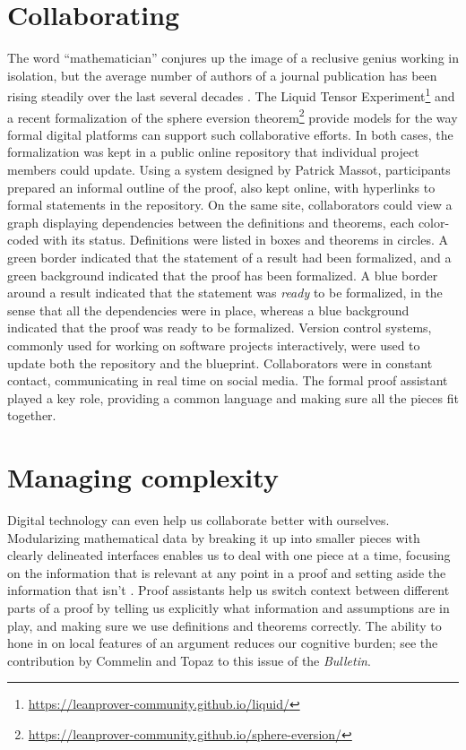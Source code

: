 \documentclass{amsart}
\theoremstyle{definition}
\theoremstyle{remark}
\numberwithin{equation}{section}
\begin{document}
\section{Collaborating}

The word ``mathematician'' conjures up the image of a reclusive genius working in isolation, but the average number of authors of a journal publication has been rising steadily over the last several decades \cite{grossman:05,richard:sun:21}. The Liquid Tensor Experiment\footnote{\url{https://leanprover-community.github.io/liquid/}} and a recent formalization of the sphere eversion theorem\footnote{\url{https://leanprover-community.github.io/sphere-eversion/}} \cite{van:doorn:et:al:23} provide models for the way formal digital platforms can support such collaborative efforts. In both cases, the formalization was kept in a public online repository that individual project members could update. Using a system designed by Patrick Massot, participants prepared an informal outline of the proof, also kept online, with hyperlinks to formal statements in the repository. On the same site, collaborators could view a graph displaying dependencies between the definitions and theorems, each color-coded with its status. Definitions were listed in boxes and theorems in circles. A green border indicated that the statement of a result had been formalized, and a green background indicated that the proof has been formalized. A blue border around a result indicated that the statement was \emph{ready} to be formalized, in the sense that all the dependencies were in place, whereas a blue background indicated that the proof was ready to be formalized. Version control systems, commonly used for working on software projects interactively, were used to update both the repository and the blueprint. Collaborators were in constant contact, communicating in real time on social media. The formal proof assistant played a key role, providing a common language and making sure all the pieces fit together.


\section{Managing complexity}

Digital technology can even help us collaborate better with ourselves.
Modularizing mathematical data by breaking it up into smaller pieces with clearly delineated interfaces enables us to deal with one piece at a time, focusing on the information that is relevant at any point in a proof and setting aside the information that isn't \cite{avigad:20}. Proof assistants help us switch context between different parts of a proof by telling us explicitly what information and assumptions are in play, and making sure we use definitions and theorems correctly. The ability to hone in on local features of an argument reduces our cognitive burden; see the contribution by Commelin and Topaz to this issue of the \emph{Bulletin}.
\end{document}
